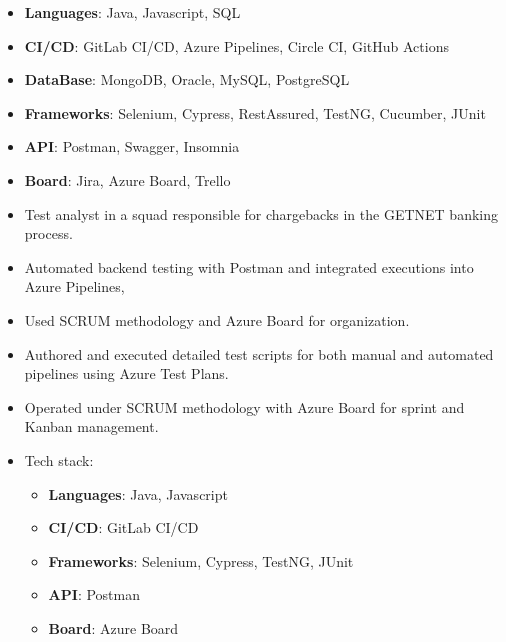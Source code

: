 {\begin{itemize}
    \begin{itemize}
        \item \textbf{Languages}: {\color{accent2}Java, Javascript, SQL}
        \item \textbf{CI/CD}: {\color{accent2}GitLab CI/CD, Azure Pipelines, Circle CI, GitHub Actions}
        \item \textbf{DataBase}: {\color{accent2}MongoDB, Oracle, MySQL, PostgreSQL}
        \item \textbf{Frameworks}: {\color{accent2}Selenium, Cypress, RestAssured, TestNG, Cucumber, JUnit}
        \item \textbf{API}: {\color{accent2}Postman, Swagger, Insomnia}
        \item \textbf{Board}: {\color{accent2}Jira, Azure Board, Trello}
    \end{itemize}
\end{itemize}

\begin{itemize}
    \item Test analyst in a squad responsible for chargebacks in the GETNET banking process.
    \item Automated backend testing with Postman and integrated executions into Azure Pipelines,
    \item Used SCRUM methodology and Azure Board for organization.
    \item Authored and executed detailed test scripts for both manual and automated pipelines using Azure Test Plans.
    \item Operated under SCRUM methodology with Azure Board for sprint and Kanban management.
    \item Tech stack:    
    \begin{itemize}
        \item \textbf{Languages}: {\color{accent2}Java, Javascript}
        \item \textbf{CI/CD}: {\color{accent2}GitLab CI/CD}
        \item \textbf{Frameworks}: {\color{accent2}Selenium, Cypress, TestNG, JUnit}
        \item \textbf{API}: {\color{accent2}Postman}
        \item \textbf{Board}: {\color{accent2}Azure Board}
    \end{itemize}
\end{itemize}

}
